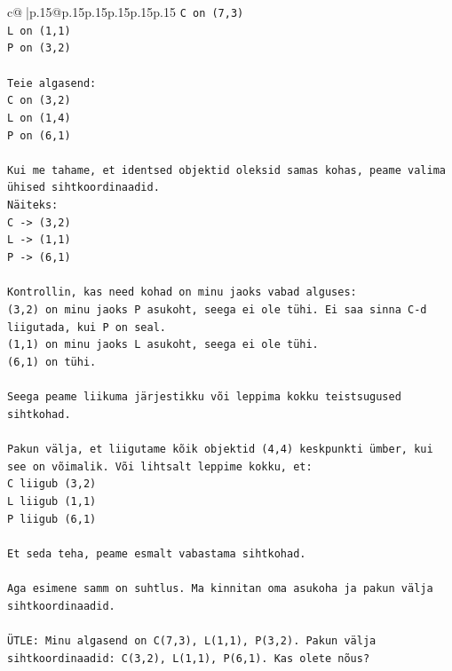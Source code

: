 \documentclass{article}
\begin{document}
{\begin{supertabular}{c@{$\;$}|p{.15\linewidth}@{}p{.15\linewidth}p{.15\linewidth}p{.15\linewidth}p{.15\linewidth}p{.15\linewidth}}
{{{\texttt{C on (7,3)} \\
\texttt{L on (1,1)} \\
\texttt{P on (3,2)} \\
\\ 
\texttt{Teie algasend:} \\
\texttt{C on (3,2)} \\
\texttt{L on (1,4)} \\
\texttt{P on (6,1)} \\
\\ 
\texttt{Kui me tahame, et identsed objektid oleksid samas kohas, peame valima ühised sihtkoordinaadid.} \\
\texttt{Näiteks:} \\
\texttt{C {-}> (3,2)} \\
\texttt{L {-}> (1,1)} \\
\texttt{P {-}> (6,1)} \\
\\ 
\texttt{Kontrollin, kas need kohad on minu jaoks vabad alguses:} \\
\texttt{(3,2) on minu jaoks P asukoht, seega ei ole tühi. Ei saa sinna C{-}d liigutada, kui P on seal.} \\
\texttt{(1,1) on minu jaoks L asukoht, seega ei ole tühi.} \\
\texttt{(6,1) on tühi.} \\
\\ 
\texttt{Seega peame liikuma järjestikku või leppima kokku teistsugused sihtkohad.} \\
\\ 
\texttt{Pakun välja, et liigutame kõik objektid (4,4) keskpunkti ümber, kui see on võimalik. Või lihtsalt leppime kokku, et:} \\
\texttt{C liigub (3,2)} \\
\texttt{L liigub (1,1)} \\
\texttt{P liigub (6,1)} \\
\\ 
\texttt{Et seda teha, peame esmalt vabastama sihtkohad.} \\
\\ 
\texttt{Aga esimene samm on suhtlus. Ma kinnitan oma asukoha ja pakun välja sihtkoordinaadid.} \\
\\ 
\texttt{ÜTLE: Minu algasend on C(7,3), L(1,1), P(3,2). Pakun välja sihtkoordinaadid: C(3,2), L(1,1), P(6,1). Kas olete nõus?} \\
            }
        }
    }
     \\ \\


\end{supertabular}}
\end{document}
